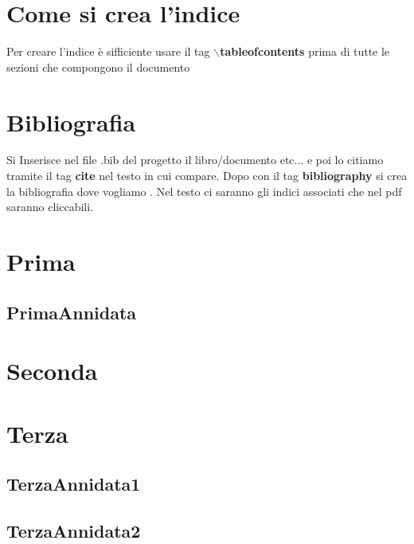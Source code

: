 \documentclass{article}
\begin{document}
\tableofcontents
\section{Come si crea l'indice}
Per creare l'indice è sifficiente usare il tag \textbf{$\backslash$tableofcontents} prima di tutte le sezioni che compongono il documento
\section{Bibliografia}
Si Inserisce nel file .bib del progetto il libro/documento etc... e poi lo citiamo tramite il tag \textbf{cite} nel testo in cui compare. Dopo con il tag \textbf{bibliography} si crea la bibliografia dove vogliamo \cite{adams1995hitchhiker}. Nel testo ci saranno gli indici associati che nel pdf saranno cliccabili. 
\section{Prima}
\lipsum[1]  %
\subsection{PrimaAnnidata}
\lipsum[1]

\section{Seconda}
\lipsum[1]

\section{Terza}
\lipsum[1]
\subsection{TerzaAnnidata1}
\lipsum[1]
\subsection{TerzaAnnidata2}
\lipsum[1]



\end{document}
